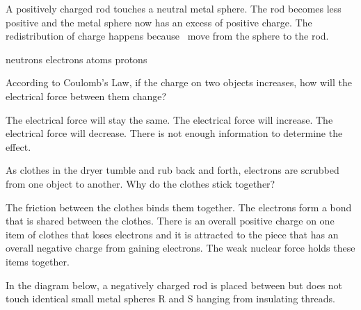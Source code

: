\documentclass[]{exam}
\begin{document}
\begin{questions}

\question
A positively charged rod touches a neutral metal sphere. The rod becomes less positive and the metal sphere now has an excess of positive charge. The redistribution of charge happens because \fillin[electrons][3cm]\ move from the sphere to the rod.

\begin{randomizechoices}
    \choice neutrons
    \correctchoice electrons
    \choice atoms
    \choice protons
\end{randomizechoices}



\question
According to Coulomb’s Law, if the charge on two objects increases, how will the electrical force between them change?

\begin{randomizechoices}[keeplast]
    \choice The electrical force will stay the same.
    \correctchoice The electrical force will increase.
    \choice The electrical force will decrease.
    \choice There is not enough information to determine the effect.
\end{randomizechoices}

\question
As clothes in the dryer tumble and rub back and forth, electrons are scrubbed from one object to another. Why do the clothes stick together?

\begin{randomizechoices}
    \choice The friction between the clothes binds them together.
    \choice The electrons form a bond that is shared between the clothes.
    \correctchoice There is an overall positive charge on one item of clothes that loses electrons and it is attracted to the piece that has an overall negative charge from gaining electrons.
    \choice The weak nuclear force holds these items together.
\end{randomizechoices}

\question
In the diagram below, a negatively charged rod is placed between but does not touch identical small metal spheres R and S hanging from insulating threads. 

\begin{center}


\end{center}
\end{questions}
\end{document}
